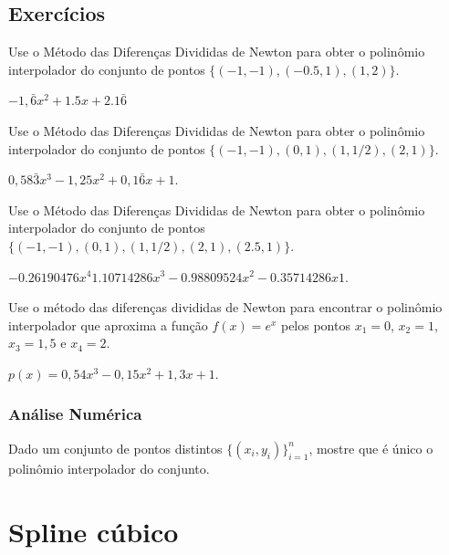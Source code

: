 \subsection*{Exercícios}

\begin{exer}
  Use o Método das Diferenças Divididas de Newton para obter o polinômio interpolador do conjunto de pontos $\{(-1, -1), (-0.5, 1), (1, 2)\}$.
\end{exer}
\begin{resp}
  $-1,\bar{6}x^2 + 1.5x + 2.1\bar{6}$
\end{resp}

\begin{exer}
  Use o Método das Diferenças Divididas de Newton para obter o polinômio interpolador do conjunto de pontos $\{(-1, -1), (0, 1), (1, 1/2), (2, 1)\}$.
\end{exer}
\begin{resp}
  $0,58\bar{3}x^3 - 1,25x^2 + 0,1\bar{6}x + 1$. 
\end{resp}

\begin{exer}
  Use o Método das Diferenças Divididas de Newton para obter o polinômio interpolador do conjunto de pontos $\{(-1, -1), (0, 1), (1, 1/2), (2, 1), (2.5, 1)\}$.
\end{exer}
\begin{resp}
  $-0.26190476x^4  1.10714286x^3 -0.98809524x^2 -0.35714286x  1$.  
\end{resp}

\begin{exer}
  Use o método das diferenças divididas de Newton para encontrar o polinômio interpolador que aproxima a função $f(x)=e^{x}$ pelos pontos $x_1=0$, $x_2=1$, $x_3=1,5$ e $x_4=2$.
\end{exer}
\begin{resp}
$p(x) = 0,54x^3 - 0,15x^2 + 1,3x + 1$.
\end{resp}

\subsubsection{Análise Numérica}

\begin{exer}\label{cap_interp_sec_difdiv:exer:pinterp_unico}
  Dado um conjunto de pontos distintos $\{(x_i, y_i)\}_{i=1}^n$, mostre que é único o polinômio interpolador do conjunto.
\end{exer}


\section{Spline cúbico}\label{cap_interp_splines}

